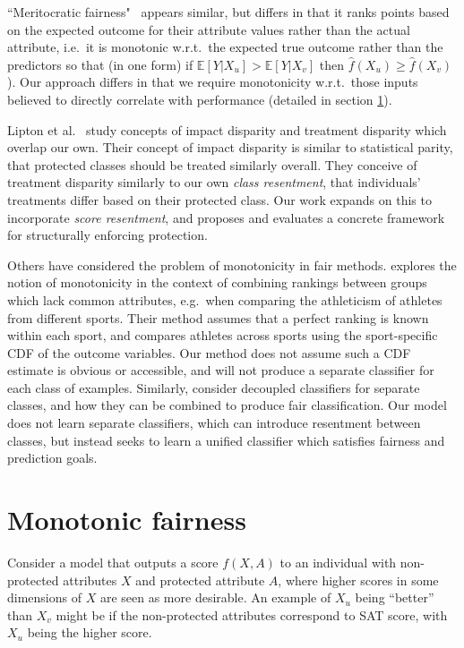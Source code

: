    ``Meritocratic fairness"~\cite{joseph2016} appears similar, but differs in that it ranks points based on the expected outcome for their attribute values rather than the actual attribute, i.e.\ it is monotonic w.r.t.\ the expected true outcome rather than the predictors so that (in one form) if $\mathbb{E}[Y | X_u] > \mathbb{E}[Y | X_v]$ then $\hat{f}(X_u) \ge \hat{f}(X_v)$).  Our approach differs in that we require monotonicity w.r.t.~those inputs believed to directly correlate with performance (detailed in section \ref{sec:defs}).
    
    Lipton et al.~\cite{lipton2018treatmentdisparity} study concepts of impact disparity and treatment disparity which overlap our own. Their concept of impact disparity is similar to statistical parity, that protected classes should be treated similarly overall.  They conceive of treatment disparity similarly to our own {\it class resentment}, that individuals' treatments differ based on their protected class.  Our work expands on this to incorporate {\it score resentment}, and proposes and evaluates a concrete framework for structurally enforcing protection.
    
    Others have considered the problem of monotonicity in fair methods.  \citep{kearns2017meritocratic} explores the notion of monotonicity in the context of combining rankings between groups which lack common attributes, e.g.\ when comparing the athleticism of athletes from different sports.  Their method assumes that a perfect ranking is known within each sport, and compares athletes across sports using the sport-specific CDF of the outcome variables. Our method does not assume such a CDF estimate is obvious or accessible, and will not produce a separate classifier for each class of examples.  Similarly, \citep{dwork2018decoupled} consider decoupled classifiers for separate classes, and how they can be combined to produce fair classification.  Our model does not learn separate classifiers, which can introduce resentment between classes, but instead seeks to learn a unified classifier which satisfies fairness and prediction goals.

\section{Monotonic fairness}\label{sec:defs}
    \label{sec:monofair_defs}

    Consider a model that outputs a score $f(X, A)$ to an individual with non-protected attributes $X$ and protected attribute $A$, where higher scores in some dimensions of $X$ are seen as more desirable.
    An example of $X_u$ being ``better'' than $X_v$ might be if the non-protected attributes correspond to SAT score, with $X_u$ being the higher score. 
    

